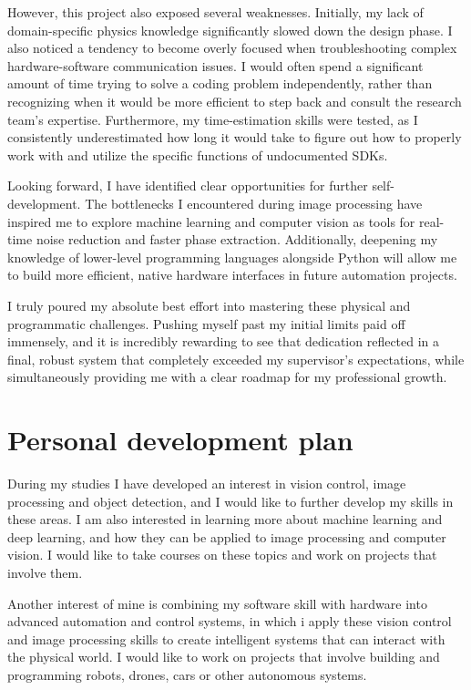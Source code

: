 \documentclass[12pt,a4paper]{article}
\begin{document}
However, this project also exposed several weaknesses. Initially, my lack of domain-specific physics knowledge significantly slowed down the design phase. I also noticed a tendency to become overly focused when troubleshooting complex hardware-software communication issues. I would often spend a significant amount of time trying to solve a coding problem independently, rather than recognizing when it would be more efficient to step back and consult the research team's expertise. Furthermore, my time-estimation skills were tested, as I consistently underestimated how long it would take to figure out how to properly work with and utilize the specific functions of undocumented SDKs.

Looking forward, I have identified clear opportunities for further self-development. The bottlenecks I encountered during image processing have inspired me to explore machine learning and computer vision as tools for real-time noise reduction and faster phase extraction. Additionally, deepening my knowledge of lower-level programming languages alongside Python will allow me to build more efficient, native hardware interfaces in future automation projects.

I truly poured my absolute best effort into mastering these physical and programmatic challenges. Pushing myself past my initial limits paid off immensely, and it is incredibly rewarding to see that dedication reflected in a final, robust system that completely exceeded my supervisor's expectations, while simultaneously providing me with a clear roadmap for my professional growth.

\newpage
\section{Personal development plan}

During my studies I have developed an interest in vision control, image processing and object detection, and I would like to further develop my skills in these areas. I am also interested in learning more about machine learning and deep learning, and how they can be applied to image processing and computer vision. I would like to take courses on these topics and work on projects that involve them.

Another interest of mine is combining my software skill with hardware into advanced automation and control systems, in which i apply these vision control and image processing skills to create intelligent systems that can interact with the physical world. I would like to work on projects that involve building and programming robots, drones, cars or other autonomous systems.
\end{document}
